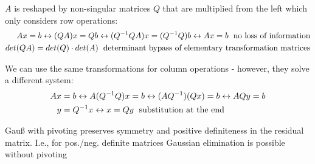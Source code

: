 \begin{definition}
	$A$ is reshaped by non-singular matrices $Q$ that are multiplied from the left which only considers row operations:
	\begin{align*}
		Ax=b \leftrightarrow (QA)x = Qb \leftrightarrow (Q^{-1}QA)x = (Q^{-1}Q)b \leftrightarrow Ax = b \text{\; no loss of information} \\
		det (QA) = det(Q) \cdot det(A) \text{\; determinant bypass of elementary transformation matrices}
	\end{align*}
\end{definition}

\begin{definition}
	We can use the same transformations for column operations - however, they solve a different system:
	\begin{align*}
	Ax&=b \leftrightarrow A(Q^{-1}Q)x=b \leftrightarrow (AQ^{-1})(Qx)=b \leftrightarrow AQy = b \\
	y &= Q^{-1}x  \leftrightarrow x = Qy \text{\; substitution at the end}
	\end{align*}
\end{definition}

\begin{satz}
	Gauß with pivoting preserves symmetry and positive definiteness in the residual matrix. I.e., for pos./neg. definite matrices Gaussian elimination is possible without pivoting
\end{satz}

